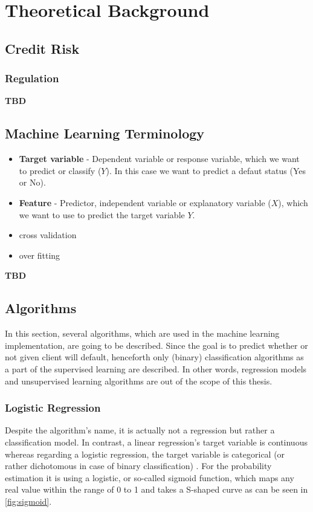 \chapter{Theoretical Background}
\label{chap:two}

\section{Credit Risk}

\subsection{Regulation}

\textbf{TBD}

\section{Machine Learning Terminology}
\begin{itemize}\setlength\itemsep{0em}
	\item \textbf{Target variable} - Dependent variable or response variable, which we want to predict or classify ($Y$). In this case we want to predict a defaut status (Yes or No).
	\item \textbf{Feature} - Predictor, independent variable or explanatory variable ($X$), which we want to use to predict the target variable $Y$.
	\item cross validation
	\item over fitting
\end{itemize}


\textbf{TBD}
\section{Algorithms}
\label{sec:algorithms}

In this section, several algorithms, which are used in the machine learning implementation, are going to be described. Since the goal is to predict whether or not given client will default, henceforth only (binary) classification algorithms as a part of the supervised learning are described. In other words, regression models and unsupervised learning algorithms are out of the scope of this thesis.
\subsection{Logistic Regression}
\label{subsubsec:logisticregression}

Despite the algorithm's name, it is actually not a regression but rather a classification model.
In contrast, a linear regression's target variable is continuous whereas regarding a logistic regression, the target variable is categorical (or rather dichotomous in case of binary classification) \citep{wendler2021data}.
For the probability estimation it is using a logistic, or so-called sigmoid function, which maps any real value within the range of 0 to 1 and takes a S-shaped curve as can be seen in \autoref{fig:sigmoid}.

